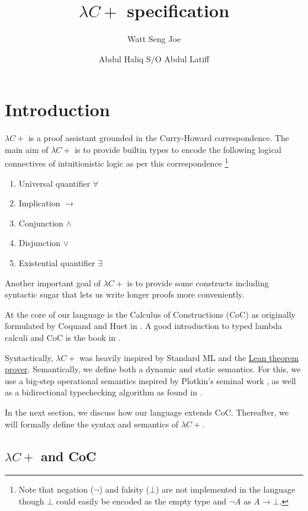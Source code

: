 \documentclass{article}
\title{$\lambda C+$ specification}
\author{Watt Seng Joe \and Abdul Haliq S/O Abdul Latiff}
\begin{document}
\maketitle
\tableofcontents
\newpage

\section{Introduction}
$\lambda C+$ is a proof assistant grounded in the Curry-Howard correspondence.
The main aim of $\lambda C+$ is to provide builtin types to encode the following
logical connectives of intuitionistic logic as per this correspondence
\footnote{
  Note that negation ($\neg$) and falsity ($\bot$) are not implemented in the
  language though $\bot$ could easily be encoded as the empty type and $\neg A$
  as $A \rightarrow \bot$.
}

\begin{enumerate}
  \item Universal quantifier $\forall$
  \item Implication $\rightarrow$
  \item Conjunction $\wedge$
  \item Disjunction $\vee$ 
  \item Existential quantifier $\exists$
\end{enumerate}

Another important goal of $\lambda C+$ is to provide some constructs
including syntactic sugar that lets us write longer proofs more conveniently.

At the core of our language is the Calculus of Constructions (CoC) as 
originally formulated by Coquand and Huet in \cite{coc_coquand_huet}.
A good introduction to typed lambda calculi and CoC is the book in 
\cite{type_theory_and_formal_proof}. 

Syntactically, $\lambda C+$ was heavily inspired by Standard ML and the
\href{https://leanprover.github.io/}{Lean theorem prover}.
Semantically, we define both a dynamic and static semantics.
For this, we use a big-step operational semantics inspired by
Plotkin's seminal work \cite{plotkin_sos}, as well as a bidirectional typechecking
algorithm as found in \cite{lambdapi}. 

In the next section, we discuss how our language extends CoC. Thereafter, we
will formally define the syntax and semantics of $\lambda C+$.

\subsection{
  \texorpdfstring{$\lambda C+$}{Lambdacplus} and CoC
}
\end{document}
